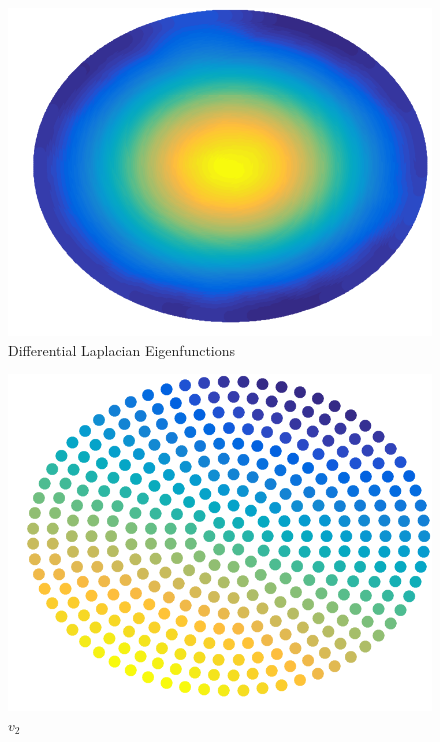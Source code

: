 \documentclass{beamer}
\begin{document}
\begin{frame}
\begin{figure}
\begin{minipage}[b]{0.18\linewidth}
      \centering
      \includegraphics[width=\textwidth]{./Images/DiscExample/ManifoldLaplacian/evec06.png}
      \caption{\tiny $v_6$}
    \end{minipage}
    \caption{Differential Laplacian Eigenfunctions}
  \end{figure}
  \vspace*{-5mm}
  \begin{figure}
    \hfill
    \begin{minipage}[b]{0.18\linewidth}
      \centering
      \includegraphics[width=\textwidth]{./Images/DiscExample/GraphLaplacian/evec02.png}
      \caption{\tiny $v_2$}
    \end{minipage}

\end{figure}
\end{frame}
\end{document}
